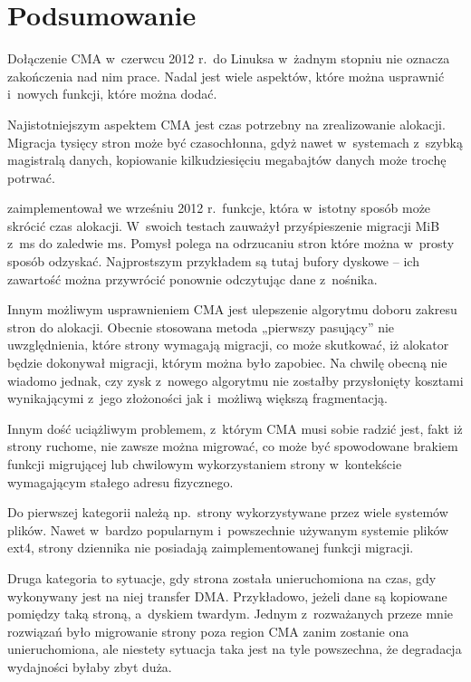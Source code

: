 \section{Podsumowanie}

Dołączenie CMA w~czerwcu 2012 r.\ do Linuksa w~żadnym stopniu nie
oznacza zakończenia nad nim prace.  Nadal jest wiele aspektów, które
można usprawnić i~nowych funkcji, które można dodać.

Najistotniejszym aspektem CMA jest czas potrzebny na zrealizowanie
alokacji.  Migracja tysięcy stron może być czasochłonna, gdyż nawet
w~systemach z~szybką magistralą danych, kopiowanie kilkudziesięciu
megabajtów danych może trochę potrwać.

\textcite{patch:cma-discard} zaimplementował we wrześniu 2012
r.\ funkcje, która w~istotny sposób może skrócić czas alokacji.
W~swoich testach zauważył przyśpieszenie migracji \unit[10]{MiB}
z~\unit[146]{ms} do zaledwie \unit[7]{ms}.  Pomysł polega na
odrzucaniu stron które można w~prosty sposób odzyskać.  Najprostszym
przykładem są tutaj bufory dyskowe -- ich zawartość można przywrócić
ponownie odczytując dane z~nośnika.

Innym możliwym usprawnieniem CMA jest ulepszenie algorytmu doboru
zakresu stron do alokacji.  Obecnie stosowana metoda „pierwszy
pasujący” nie uwzględnienia, które strony wymagają migracji, co może
skutkować, iż alokator będzie dokonywał migracji, którym można było
zapobiec.  Na chwilę obecną nie wiadomo jednak, czy zysk z~nowego
algorytmu nie zostałby przysłonięty kosztami wynikającymi z~jego
złożoności jak i~możliwą większą fragmentacją.

Innym dość uciążliwym problemem, z~którym CMA musi sobie radzić jest,
fakt iż strony ruchome, nie zawsze można migrować, co może być
spowodowane brakiem funkcji migrującej lub chwilowym wykorzystaniem
strony w~kontekście wymagającym stałego adresu fizycznego.

Do pierwszej kategorii należą np.\ strony wykorzystywane przez wiele
systemów plików.  Nawet w~bardzo popularnym i~powszechnie używanym
systemie plików ext4, strony dziennika nie posiadają zaimplementowanej
funkcji migracji.

Druga kategoria to sytuacje, gdy strona została unieruchomiona na
czas, gdy wykonywany jest na niej transfer DMA.  Przykładowo, jeżeli
dane są kopiowane pomiędzy taką stroną, a~dyskiem twardym.  Jednym
z~rozważanych przeze mnie rozwiązań było migrowanie strony poza region
CMA zanim zostanie ona unieruchomiona, ale niestety sytuacja taka jest
na tyle powszechna, że degradacja wydajności byłaby zbyt duża.

